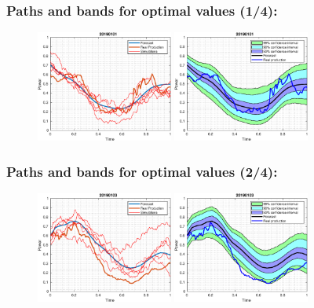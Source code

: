 \documentclass[aspectratio=169]{beamer}\usepackage[utf8]{inputenc}
\begin{document}

\begin{frame}\frametitle{Paths and bands for optimal values (1/4):}

\begin{figure}[ht!]
\centering
\includegraphics[width=0.4\textwidth]{../Results/paths_testing_days/optimal_value/1.eps}\quad
\includegraphics[width=0.4\textwidth]{../Results/bands_testing_days/optimal_value/1.eps}
\end{figure}

\end{frame}


\begin{frame}\frametitle{Paths and bands for optimal values (2/4):}

\begin{figure}[ht!]
\centering
\includegraphics[width=0.4\textwidth]{../Results/paths_testing_days/optimal_value/2.eps}\quad
\includegraphics[width=0.4\textwidth]{../Results/bands_testing_days/optimal_value/2.eps}
\end{figure}

\end{frame}
\end{document}

